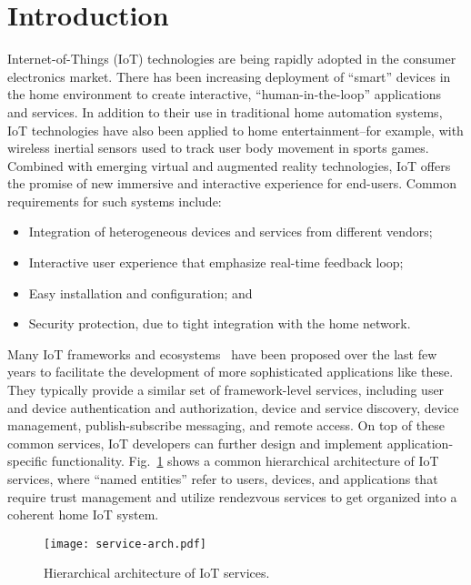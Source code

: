 \section{Introduction}
\label{sec:introduction}

Internet-of-Things (IoT) technologies are being rapidly adopted in the consumer electronics market.
There has been increasing deployment of ``smart'' devices in the home environment to create interactive, ``human-in-the-loop'' applications and services.
In addition to their use in traditional home automation systems, IoT technologies have also been applied to home entertainment--for example, with wireless inertial sensors used to track user body movement in sports games. Combined with emerging virtual and augmented reality technologies, IoT offers the promise of new immersive and interactive experience for end-users.
Common requirements for such systems include:
\begin{itemize}
\item Integration of heterogeneous devices and services from different vendors;
\item Interactive user experience that emphasize real-time feedback loop;
\item Easy installation and configuration; and
\item Security protection, due to tight integration with the home network.
\end{itemize}

Many IoT frameworks and ecosystems~\cite{alljoyn,iotivity,aws-iot,weave,azure-iot,smartthings,homekit} have been proposed over the last few years to facilitate the development of more sophisticated applications like these.
They typically provide a similar set of framework-level services, including user and device authentication and authorization, device and service discovery, device management, publish-subscribe messaging, and remote access.
On top of these common services, IoT developers can further design and implement application-specific functionality. %
Fig.~\ref{fig:service-arch} shows a common hierarchical architecture of IoT services, where ``named entities'' refer to users, devices, and applications that require trust management and utilize rendezvous services to get organized into a coherent home IoT system.

\begin{figure}[!t]
\centering
\texttt{[image: service-arch.pdf]}
\caption{Hierarchical architecture of IoT services.}
\label{fig:service-arch}
\end{figure}

